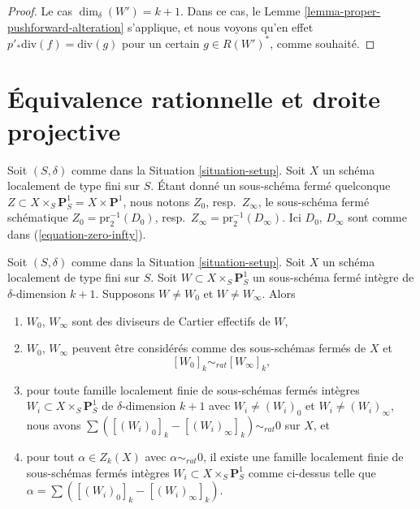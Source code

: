 \begin{proof}
\medskip\noindent
Le cas $\dim_\delta(W') = k + 1$. Dans ce cas, le
Lemme \ref{lemma-proper-pushforward-alteration} s'applique,
et nous voyons qu'en effet $p'_*\text{div}(f) = \text{div}(g)$
pour un certain $g \in R(W')^*$, comme souhaité.
\end{proof}















\section{Équivalence rationnelle et droite projective}
\label{section-different-rational-equivalence}

\noindent
Soit $(S, \delta)$ comme dans la Situation \ref{situation-setup}.
Soit $X$ un schéma localement de type fini sur $S$.
Étant donné un sous-schéma fermé quelconque
$Z \subset X \times_S \mathbf{P}^1_S = X \times \mathbf{P}^1$,
nous notons $Z_0$, resp.\ $Z_\infty$, le sous-schéma fermé schématique
$Z_0 = \text{pr}_2^{-1}(D_0)$,
resp.\ $Z_\infty = \text{pr}_2^{-1}(D_\infty)$.
Ici $D_0$, $D_\infty$ sont comme dans (\ref{equation-zero-infty}).

\begin{lemma}
\label{lemma-rational-equivalence-family}
Soit $(S, \delta)$ comme dans la Situation \ref{situation-setup}.
Soit $X$ un schéma localement de type fini sur $S$.
Soit $W \subset X \times_S \mathbf{P}^1_S$ un sous-schéma fermé
intègre de $\delta$-dimension $k + 1$.
Supposons $W \not = W_0$ et $W \not = W_\infty$. Alors
\begin{enumerate}
\item $W_0$, $W_\infty$ sont des diviseurs de Cartier effectifs de $W$,
\item $W_0$, $W_\infty$ peuvent être considérés comme des sous-schémas fermés
de $X$ et
$$
[W_0]_k \sim_{rat} [W_\infty]_k,
$$
\item pour toute famille localement finie de
sous-schémas fermés intègres
$W_i \subset X \times_S \mathbf{P}^1_S$
de $\delta$-dimension $k + 1$ avec $W_i \not = (W_i)_0$ et
$W_i \not = (W_i)_\infty$, nous avons
$\sum ([(W_i)_0]_k - [(W_i)_\infty]_k) \sim_{rat} 0$
sur $X$, et
\item pour tout $\alpha \in Z_k(X)$ avec $\alpha \sim_{rat} 0$,
il existe une famille localement finie de
sous-schémas fermés intègres $W_i \subset X \times_S \mathbf{P}^1_S$
comme ci-dessus telle que $\alpha = \sum ([(W_i)_0]_k - [(W_i)_\infty]_k)$.
\end{enumerate}
\end{lemma}

